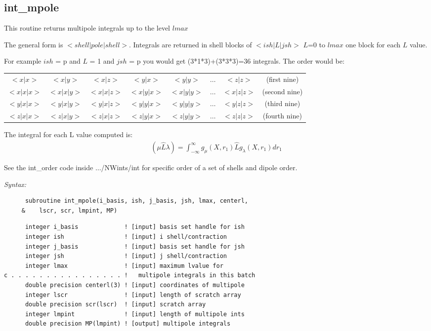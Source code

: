 \subsection{int\_mpole} 
This routine returns multipole integrals up to the level $lmax$ 
 
 The general form is $< shell | pole | shell >$.  
 Integrals are returned in shell blocks of $<ish|L|jsh>$ $L$=0 to $lmax$ 
 one block for each $L$ value.   
 
 For example $ish$ = p and $L$ = 1 and $jsh$ = p you would get  
 (3*1*3)+(3*3*3)=36 integrals. 
 The order would be:\\ 
\begin{tabular}{cccccccc} 
  $<x|x>$   & $<x|y>$   & $<x|z>$   & $<y|x>$   & $<y|y>$  & $\ldots$ & $<z|z>$   & (first nine) \\ 
  $<x|x|x>$ & $<x|x|y>$ & $<x|x|z>$ & $<x|y|x>$ & $<x|y|y>$ & $\ldots$ & $<x|z|z>$ & (second nine)\\ 
  $<y|x|x>$ & $<y|x|y>$ & $<y|x|z>$ & $<y|y|x>$ & $<y|y|y>$ & $\ldots$ & $<y|z|z>$ & (third nine)\\ 
  $<z|x|x>$ & $<z|x|y>$ & $<z|x|z>$ & $<z|y|x>$ & $<z|y|y>$ & $\ldots$ & $<z|z|z>$ & (fourth nine) 
\end{tabular} 
 
The integral for each L value computed is: 
\begin{eqnarray*} 
({\mu}{\hat{L}}{\lambda}) = \int_{-\infty}^{\infty} g_{\mu}(X,r_{1})\hat{L}g_{\lambda}(X,r_{1})dr_{1} 
\end{eqnarray*} 
 
 
 See the int\_order code inside $\ldots$/NWints/int for specific order of a  
 set of shells and dipole order.  
 
{\it Syntax:} 
\begin{verbatim} 
      subroutine int_mpole(i_basis, ish, j_basis, jsh, lmax, centerl, 
     &    lscr, scr, lmpint, MP) 
\end{verbatim} 
\begin{verbatim} 
      integer i_basis             ! [input] basis set handle for ish 
      integer ish                 ! [input] i shell/contraction 
      integer j_basis             ! [input] basis set handle for jsh 
      integer jsh                 ! [input] j shell/contraction 
      integer lmax                ! [input] maximum lvalue for  
c . . . . . . . . . . . . . . . . !   multipole integrals in this batch 
      double precision centerl(3) ! [input] coordinates of multipole 
      integer lscr                ! [input] length of scratch array 
      double precision scr(lscr)  ! [input] scratch array 
      integer lmpint              ! [input] length of multipole ints 
      double precision MP(lmpint) ! [output] multipole integrals 
\end{verbatim} 
